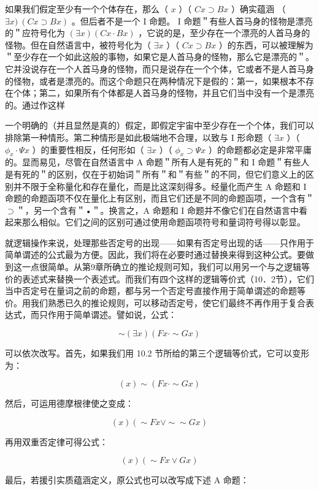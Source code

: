 如果我们假定至少有一个个体存在，那么（ $x$ ）（ $C x \supset B x$ ）确实蕴涵 （ $\exists x) ~(C x \supset B x)$ 。但后者不是一个 I 命题。 I 命题＂有些人首马身的怪物是漂亮的＂应符号化为 $(\exists x)(C x \cdot B x)$ ，它说的是，至少存在一个漂亮的人首马身的怪物。但在自然语言中，被符号化为（ $\exists x$ ）（ $C x \supset B x$ ）的东西，可以被理解为＂至少存在一个如此这般的事物，如果它是人首马身的怪物，那么它是漂亮的＂。它并没说存在一个人首马身的怪物，而只是说存在一个个体，它或者不是人首马身的怪物，或者是漂亮的。而这个命题只在两种情况下是假的：第一，如果根本不存在个体；第二，如果所有个体都是人首马身的怪物，并且它们当中没有一个是漂亮的。通过作这样

一个明确的（并且显然是真的）假定，即假定宇宙中至少存在一个个体，我们可以排除第一种情形。第二种情形是如此极端地不合理，以致与 I 形命题（ $\exists x$ ）（ $\phi_{x} \cdot \Psi x$ ）的重要性相反，任何形如（ $\exists x$ ）（ $\phi_{x} \supset \Psi x$ ）的命题都必定是非常平庸的。显而易见，尽管在自然语言中 A 命题＂所有人是有死的＂和 I 命题＂有些人是有死的＂的区别，仅在于初始词＂所有＂和＂有些＂的不同，但它们意义上的区别并不限于全称量化和存在量化，而是比这深刻得多。经量化而产生 A 命题和 I 命题的命题函项不仅在量化上有区别，而且它们还是不同的命题函项，一个含有＂$\supset$＂，另一个含有＂•＂。换言之，A 命题和 I 命题并不像它们在自然语言中看起来那么相似。它们之间的区别可通过使用命题函项符号和量词符号得以彰显。

就逻辑操作来说，处理那些否定号的出现——如果有否定号出现的话——只作用于简单谓述的公式最为方便。因此，我们将在必要时通过替换来得到这种公式。要做到这一点很简单。从第9章所确立的推论规则可知，我们可以用另一个与之逻辑等价的表述式来替换一个表述式。而我们有四个这样的逻辑等价式（10．2节），它们当中否定号在量词之前的命题，都与另一个否定号直接作用于简单谓述的命题等价。用我们熟悉已久的推论规则，可以移动否定号，使它们最终不再作用于复合表达式，而只作用于简单谓述。譬如说，公式：

$$
\sim(\exists x)(F x \cdot \sim G x)
$$

可以依次改写。首先，如果我们用 10.2 节所给的第三个逻辑等价式，它可以变形为：

$$
(x) \sim(F x \cdot \sim G x)
$$

然后，可运用德摩根律使之变成：

$$
(x)(\sim F x \vee \sim \sim G x)
$$

再用双重否定律可得公式：

$$
(x)(\sim F x \vee G x)
$$

最后，若援引实质蕴涵定义，原公式也可以改写成下述 A 命题：

